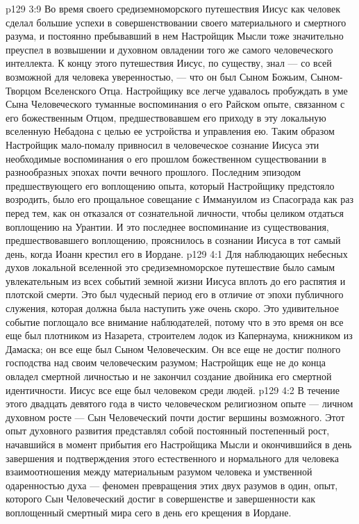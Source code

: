 \vs p129 3:9 Во время своего средиземноморского путешествия Иисус как человек сделал большие успехи в совершенствовании своего материального и смертного разума, и постоянно пребывавший в нем Настройщик Мысли тоже значительно преуспел в возвышении и духовном овладении того же самого человеческого интеллекта. К концу этого путешествия Иисус, по существу, знал --- со всей возможной для человека уверенностью, --- что он был Сыном Божьим, Сыном\hyp{}Творцом Вселенского Отца. Настройщику все легче удавалось пробуждать в уме Сына Человеческого туманные воспоминания о его Райском опыте, связанном с его божественным Отцом, предшествовавшем его приходу в эту локальную вселенную Небадона с целью ее устройства и управления ею. Таким образом Настройщик мало\hyp{}помалу привносил в человеческое сознание Иисуса эти необходимые воспоминания о его прошлом божественном существовании в разнообразных эпохах почти вечного прошлого. Последним эпизодом предшествующего его воплощению опыта, который Настройщику предстояло возродить, было его прощальное совещание с Иммануилом из Спасограда как раз перед тем, как он отказался от сознательной личности, чтобы целиком отдаться воплощению на Урантии. И это последнее воспоминание из существования, предшествовавшего воплощению, прояснилось в сознании Иисуса в тот самый день, когда Иоанн крестил его в Иордане.
\vs p129 4:1 Для наблюдающих небесных духов локальной вселенной это средиземноморское путешествие было самым увлекательным из всех событий земной жизни Иисуса вплоть до его распятия и плотской смерти. Это был чудесный период его  в отличие от эпохи публичного служения, которая должна была наступить уже очень скоро. Это удивительное событие поглощало все внимание наблюдателей, потому что в это время он все еще был плотником из Назарета, строителем лодок из Капернаума, книжником из Дамаска; он все еще был Сыном Человеческим. Он все еще не достиг полного господства над своим человеческим разумом; Настройщик еще не до конца овладел смертной личностью и не закончил создание двойника его смертной идентичности. Иисус все еще был человеком среди людей.
\vs p129 4:2 В течение этого двадцать девятого года в чисто человеческом религиозном опыте --- личном духовном росте --- Сын Человеческий почти достиг вершины возможного. Этот опыт духовного развития представлял собой постоянный постепенный рост, начавшийся в момент прибытия его Настройщика Мысли и окончившийся в день завершения и подтверждения этого естественного и нормального для человека взаимоотношения между материальным разумом человека и умственной одаренностью духа --- феномен превращения этих двух разумов в один, опыт, которого Сын Человеческий достиг в совершенстве и завершенности как воплощенный смертный мира сего в день его крещения в Иордане.
